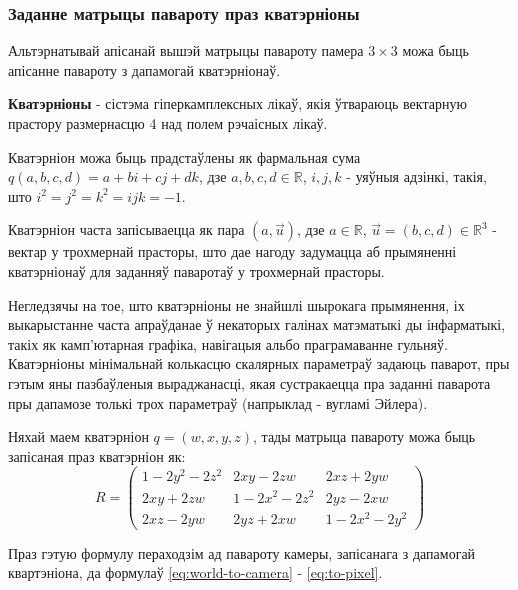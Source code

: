 \subsubsection*{Заданне матрыцы павароту праз кватэрніоны}
Альтэрнатывай апісанай вышэй матрыцы павароту памера $3 \times 3$ можа быць апісанне павароту з дапамогай кватэрніонаў.\par
{\bf Кватэрніоны} - сістэма гіперкамплексных лікаў, якія ўтвараюць вектарную прастору размернасцю 4 над полем рэчаісных лікаў.\par
Кватэрніон можа быць прадстаўлены як фармальная сума $q(a, b, c, d) = a + bi + cj + dk$, дзе $a, b, c, d \in\mathbb{R}$, $i, j, k$ - уяўныя адзінкі, такія, што $i^2 = j^2 = k^2 = ijk = -1$.\par 
Кватэрніон часта запісываецца як пара $(a, \vec{u})$, дзе $a \in\mathbb{R}$, $\vec{u} = (b, c, d) \in\mathbb{R}^3$ - вектар у трохмернай прасторы, што дае нагоду задумацца аб прымяненні кватэрніонаў для заданняў паваротаў у трохмернай прасторы. \par
Негледзячы на тое, што кватэрніоны не знайшлі шырокага прымянення, іх выкарыстанне часта апраўданае ў некаторых галінах матэматыкі ды інфарматыкі, такіх як камп'ютарная графіка, навігацыя альбо праграмаванне гульняў. Кватэрніоны мінімальнай колькасцю скалярных параметраў задаюць паварот, пры гэтым яны пазбаўленыя выраджанасці, якая сустракаецца пра заданні паварота пры дапамозе толькі трох параметраў (напрыклад - вугламі Эйлера). \par
Няхай маем кватэрніон $q = (w, x, y, z)$, тады матрыца павароту можа быць запісаная праз кватэрніон як:
\begin{equation} \label{eq:quaternion-to-rotation}
    R = \left( \begin{array}{ccc}
    1 - 2y^2 - 2z^2 & 2xy - 2zw & 2xz + 2yw \\
    2xy + 2zw & 1 - 2x^2 - 2z^2 & 2yz - 2xw \\
    2xz - 2yw & 2yz + 2xw & 1 - 2x^2 - 2y^2 \end{array} \right)
\end{equation}

Праз гэтую формулу пераходзім ад павароту камеры, запісанага з дапамогай квартэніона, да формулаў \eqref{eq:world-to-camera} - \eqref{eq:to-pixel}.

